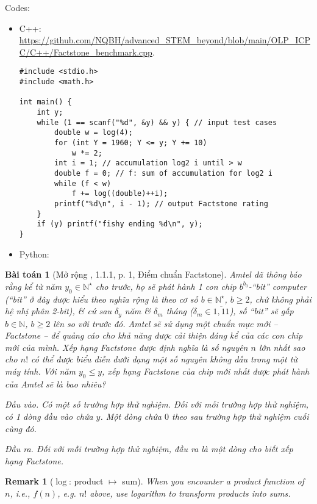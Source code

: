 \documentclass{article}
\newtheorem{baitoan}{Bài toán}
\newtheorem{remark}{Remark}
\begin{document}
Codes:
\begin{itemize}
	\item C++: \url{https://github.com/NQBH/advanced_STEM_beyond/blob/main/OLP_ICPC/C++/Factstone_benchmark.cpp}.
	\begin{verbatim}
#include <stdio.h>
#include <math.h>

int main() {
    int y;
    while (1 == scanf("%d", &y) && y) { // input test cases
        double w = log(4);
        for (int Y = 1960; Y <= y; Y += 10)
            w *= 2;
        int i = 1; // accumulation log2 i until > w
        double f = 0; // f: sum of accumulation for log2 i
        while (f < w)
            f += log((double)++i);
        printf("%d\n", i - 1); // output Factstone rating
    }
    if (y) printf("fishy ending %d\n", y);
}
	\end{verbatim}
	\item Python:
\end{itemize}

\begin{baitoan}[Mở rộng \cite{Wu_Wang2018}, 1.1.1, p. 1, Điểm chuẩn Factstone]
	{\sc Amtel} đã thông báo rằng kể từ năm $y_0\in\mathbb{N}^\star$ cho trước, họ sẽ phát hành 1 con chip $b^{b_0}$-``bit'' computer (``bit'' ở đây được hiểu theo nghĩa rộng là theo cơ số $b\in\mathbb{N}^\star$, $b\ge2$, chứ không phải hệ nhị phân 2-bit), \& cứ sau $\delta_y$ năm \& $\delta_m$ tháng ($\delta_m\in\overline{1,11}$), số ``bit'' sẽ gấp $b\in\mathbb{N}$, $b\ge2$ lên so với trước đó. {\sc Amtel} sẽ sử dụng một chuẩn mực mới -- {\rm Factstone} -- để quảng cáo cho khả năng được cải thiện đáng kể của các con chip mới của mình. Xếp hạng {\rm Factstone} được định nghĩa là số nguyên $n$ lớn nhất sao cho $n!$ có thể được biểu diễn dưới dạng một số nguyên không dấu trong một từ máy tính. Với năm $y_0\le y$, xếp hạng {\rm Factstone} của chip mới nhất được phát hành của {\sc Amtel} sẽ là bao nhiêu?
	\item {\sf Đầu vào.} Có một số trường hợp thử nghiệm. Đối với mỗi trường hợp thử nghiệm, có 1 dòng đầu vào chứa $y$. Một dòng chứa $0$ theo sau trường hợp thử nghiệm cuối cùng đó.
	\item {\sf Đầu ra.} Đối với mỗi trường hợp thử nghiệm, đầu ra là một dòng cho biết xếp hạng Factstone.
\end{baitoan}

\begin{remark}[$\log$: product $\mapsto$ sum]
	When you encounter a product function of $n$, i.e., $f(n)$, e.g. $n!$ above, use logarithm to transform products into sums.
\end{remark}
\end{document}
